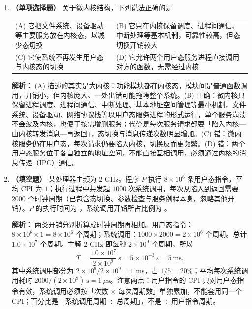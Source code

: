 \begin{enumerate}
\vspace{8pt}

\item \textbf{（单项选择题）} 关于微内核结构，下列说法正确的是
\begin{center}
\begin{tabularx}{\linewidth}{@{}XX@{}}
(A) 它把文件系统、设备驱动等主要服务放在内核态，以减少态切换 & (B) 它只在内核保留调度、进程间通信、中断处理等基本机制，可靠性较高，但态切换开销较大 \\[4pt]
(C) 它使系统不再发生用户态与内核态的切换 & (D) 它允许两个用户态服务进程直接调用对方的函数，无需经过内核
\end{tabularx}
\end{center}

\ifshowsolutions\par\noindent\textbf{解析：} (A) 描述的其实是大内核：功能模块都在内核态，模块间是普通函数调用，开销小，但内核庞大、一处出错可能拖垮整个系统。(B) 正确：微内核只保留进程调度、进程间通信、中断处理、基本地址空间管理等最小机制，文件系统、设备驱动、网络协议栈等以用户态服务进程的形式运行，单个服务崩溃不会波及内核，也便于按需增删服务；代价是每次服务请求都要「陷入内核—由内核转发消息—再返回」，态切换与消息传递次数明显增加。(C) 错：微内核服务仍在用户态，每次请求仍要陷入内核，切换反而更频繁。(D) 错：两个用户态服务位于各自独立的地址空间，不能直接互相调用，必须通过内核的消息传递（IPC）通信。\else \answerarea \fi

\vspace{8pt}

\item \textbf{（填空题）} 某处理器主频为 $2$ GHz。程序 $P$ 执行 $8\times 10^{6}$ 条用户态指令，平均 CPI 为 $1$；执行过程中共发起 $1000$ 次系统调用，每次从陷入到返回需要 $2000$ 个时钟周期（已包含态切换、参数检查与服务例程本身，忽略其他开销）。$P$ 的执行时间为 \underline{\hspace{2.2cm}}，系统调用开销所占比例为 \underline{\hspace{2.2cm}}。

\ifshowsolutions\par\noindent\textbf{解析：} 两类开销分别折算成时钟周期再相加。用户态指令：$8\times10^{6}\times1=8\times10^{6}$ 个周期；系统调用：$1000\times2000=2\times10^{6}$ 个周期。总计 $1.0\times10^{7}$ 个周期。主频 $2$ GHz 即每秒 $2\times10^{9}$ 个周期，所以
\[
T=\frac{1.0\times10^{7}}{2\times10^{9}}\ \text{s}=5\times10^{-3}\ \text{s}=5\ \text{ms}.
\]
其中系统调用部分为 $2\times10^{6}/2\times10^{9}=1$ ms，占 $1/5=20\%$；平均每次系统调用耗时 $2000/(2\times10^{9})\ \text{s}=1\ \mu\text{s}$。注意两点：用户指令的 CPI 只对用户态指令有效，系统调用必须按「次数 $\times$ 每次周期数」单独累加，不能套用同一个 CPI；百分比是「系统调用周期 $\div$ 总周期」，不是 $\div$ 用户指令周期。\else \answerarea[4] \fi

\end{enumerate}

